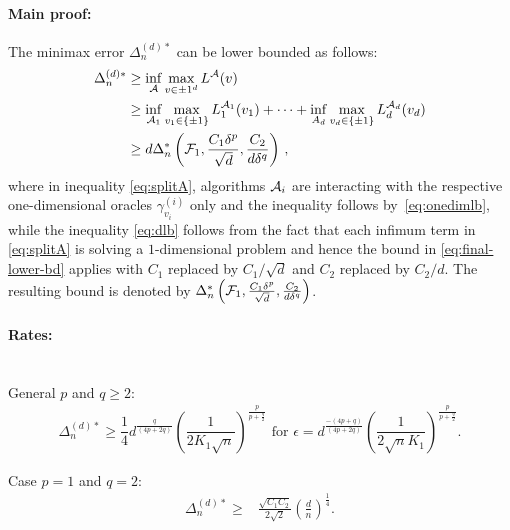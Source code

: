 \paragraph{Main proof:}
The minimax error $\Delta_n^{(d)*}$ can be lower bounded as follows:
\begin{align}
\Delta_n^{(d)*}  &\ge  \inf_{\mathcal{A}} \max_{v\in {\pm 1}^d} L^{\mathcal{A}}(v) \nonumber\\
 & \ge \inf_{\mathcal{A}_1} \max_{v_1\in \{\pm 1\}} L_1^{\mathcal{A}_1}(v_1) + \dots + 
 			\inf_{A_d} \max_{v_d\in \{\pm 1 \}} L_d^{\mathcal{A}_d}(v_d) \label{eq:splitA}\\
               & \ge d \Delta_n^{*}\left(\mathcal{F}_1,\frac{C_1\delta^p}{\sqrt d}, \frac{C_2}{d\delta^q}\right)\,, \label{eq:dlb}
\end{align}
where in inequality \eqref{eq:splitA}, algorithms $\mathcal{A}_i$ are interacting with the respective one-dimensional oracles $\gamma^{(i)}_{v_i}$ only 
and the inequality follows by~\eqref{eq:onedimlb},
while the inequality \eqref{eq:dlb} follows from the fact that each infimum term in \eqref{eq:splitA} is solving a $1$-dimensional problem and hence the bound in \eqref{eq:final-lower-bd} applies with $C_1$ replaced by $C_1/\sqrt{d}$ and $C_2$ replaced by $C_2/d$. The resulting bound is denoted by $\Delta_n^{*}\left(\mathcal{F}_1,\frac{C_1\delta^p}{\sqrt d}, \frac{C_2}{d\delta^q}\right)$. 

\paragraph{Rates:}\ \\
General $p$ and $q\ge 2$:
\begin{align}
\Delta_n^{(d)*} \ge \dfrac{1}{4} d^{\frac{q}{(4p+2q)}} \left(\dfrac{1}{2 K_1 \sqrt n}\right)^{\frac{p}{p+\frac{q}{2}}} \text{ for } 
\epsilon = d^{\frac{-(4p+q)}{(4p+2q)}}\left(\dfrac{1}{2\sqrt{n} K_1} \right)^{\frac{p}{p+\frac{q}{2}}}.
\label{eq:lb-pq-d}
\end{align}

Case $p=1$ and $q=2$:
\begin{align*}
\Delta_n^{(d)*}  \ge& \frac{\sqrt{C_1 C_2}}{2\sqrt 2}\left(\frac{d}{n}\right)^{\frac{1}{4}}.
\end{align*}

